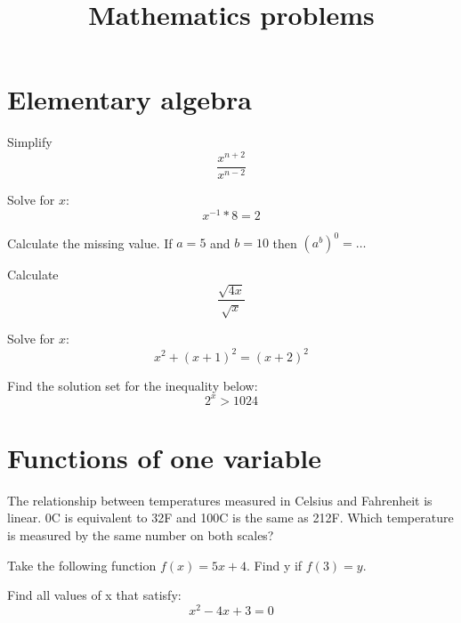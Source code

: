 \documentclass[10pt]{article}
\newenvironment{problem}[2][Problem]{\begin{trivlist}
\item[\hskip \labelsep {\bfseries #1}\hskip \labelsep {\bfseries #2.}]}{\end{trivlist}}
\begin{document}
 
\title{Mathematics problems}
\date{}
\maketitle

 \section{Elementary algebra}
 
\begin{problem}{1.1}
Simplify $$\frac{x^{n+2}}{x^{n-2}}$$
\end{problem}

\begin{problem}{1.2}
Solve for $x$:
$$x^{-1}*8=2$$
\end{problem}

\begin{problem}{1.3}
Calculate the missing value. If $a=5$ and $b=10$ then $(a^b)^0=\dots$
\end{problem}

\begin{problem}{1.4}
Calculate
$$\frac{\sqrt{4x}}{\sqrt{x}}$$
\end{problem}

\begin{problem}{1.5}
Solve for $x$:
$$x^2+(x+1)^2=(x+2)^2$$
\end{problem}

\begin{problem}{1.6}
Find the solution set for the inequality below:
$$2^x>1024$$
\end{problem}

\section{Functions of one variable}

\begin{problem}{2.1 (Based on SYD 2.5.6)}
The relationship between temperatures measured in Celsius and Fahrenheit is linear. 0\degree C is equivalent to 32\degree F and 100\degree C is the same as 212\degree F.
 Which temperature is measured by the same number on both scales?
\end{problem}

\begin{problem}{2.2}
Take the following function $f(x)=5x+4$. Find y if $f(3)=y$.
\end{problem}

\begin{problem}{2.3}
Find all values of x that satisfy:
$$x^2-4x+3=0$$
\end{problem}
\end{document}
